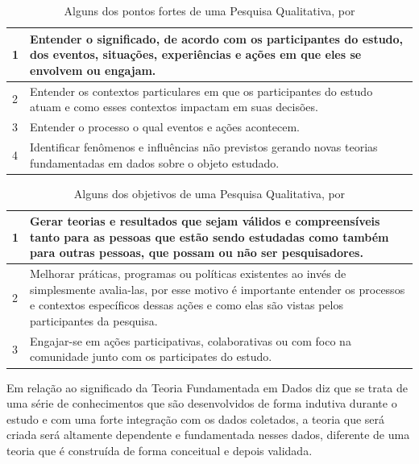 \begin{table}[!htb]
	\centering
	\begin{tabular}{ | p{3cm} | p{12cm} | }
		\hline
		1 & Entender o significado, de acordo com os participantes do estudo, dos eventos, situações, experiências e ações em que eles se envolvem ou engajam. \\ \hline
		2 & Entender os contextos particulares em que os participantes do estudo atuam e como esses contextos impactam em suas decisões. \\ \hline
		3 & Entender o processo o qual eventos e ações acontecem. \\ \hline
		4 & Identificar fenômenos e influências não previstos gerando novas teorias fundamentadas em dados sobre o objeto estudado. \\ \hline
	\end{tabular}
	\caption{Alguns dos pontos fortes de uma Pesquisa Qualitativa, por \cite{Maxwell2013}}
	\label{table:objetivos_intelectuais_segundo_maxwell}
\end{table}

\begin{table}[!htb]
	\centering
	\begin{tabular}{ | p{3cm} | p{12cm} | }
		\hline
		1 & Gerar teorias e resultados que sejam válidos e compreensíveis tanto para as pessoas que estão sendo estudadas como também para outras pessoas, que possam ou não ser pesquisadores. \\ \hline
		2 & Melhorar práticas, programas ou políticas existentes ao invés de simplesmente avalia-las, por esse motivo é importante entender os processos e contextos específicos dessas ações e como elas são vistas pelos participantes da pesquisa. \\ \hline
		3 & Engajar-se em ações participativas, colaborativas ou com foco na comunidade junto com os participates do estudo. \\ \hline
	\end{tabular}
	\caption{Alguns dos objetivos de uma Pesquisa Qualitativa, por \cite{Maxwell2013}}
	\label{table:pontos_fortes_segundo_maxwell}
\end{table}

Em relação ao significado da Teoria Fundamentada em Dados  diz que se trata de uma série de conhecimentos que são desenvolvidos de forma indutiva durante o estudo e com uma forte integração com os dados coletados, a teoria que será criada será altamente dependente e fundamentada nesses dados, diferente de uma teoria que é construída de forma conceitual e depois validada.


